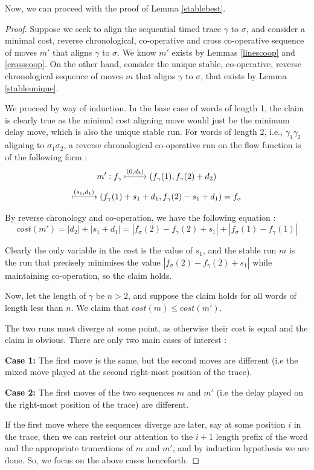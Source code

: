 \documentclass[runningheads]{llncs}
\newcounter{cases}
\begin{document}
Now, we can proceed with the proof of Lemma \ref{stablebest}. 
\begin{proof}

Suppose we seek to align the sequential timed trace $\gamma$ to $\sigma$, and consider a minimal cost, reverse chronological, co-operative and cross co-operative sequence of moves $m'$ that aligns $\gamma$ to $\sigma$. 
We know $m'$ exists by Lemmas \ref{linescoop} and \ref{crosscoop}. 
On the other hand, consider the unique stable, co-operative, reverse chronological sequence of moves $m$ that aligns $\gamma$ to $\sigma$, that exists by Lemma \ref{stableunique}. 

We proceed by way of induction. 
In the base case of words of length 1, the claim is clearly true as the minimal cost aligning move would just be the minimum delay move, which is also the unique stable run. 
For words of length 2, i.e., $\gamma_1\gamma_2$ aligning to $\sigma_1\sigma_2$, a reverse chronological co-operative run on the flow function is of the following form : $$m' : f_\gamma \xmapsto{(0,d_2)} (f_\gamma(1), f_\gamma(2) + d_2)$$$$ \xmapsto{(s_1,d_1)} (f_\gamma(1) + s_1 + d_1, f_\gamma(2) - s_1 + d_1) = f_\sigma$$

By reverse chronology and co-operation, we have the following equation : 
$$cost(m') = |d_2| + |s_1 + d_1| = |f_\sigma(2) - f_\gamma(2) + s_1| + |f_\sigma(1) - f_\gamma(1)|$$

Clearly the only variable in the cost is the value of $s_1$, and the stable run $m$ is the run that precisely minimises the value $|f_\sigma(2) - f_\gamma(2) + s_1|$ while maintaining co-operation, so the claim holds. 

Now, let the length of $\gamma$ be $n > 2$, and suppose the claim holds for all words of length less than $n$. 
We claim that $cost(m) \leq cost(m')$. 

The two runs must diverge at some point, as otherwise their cost is equal and the claim is obvious. There are only two main cases of interest : 

\textbf{Case 1: } The first move is the same, but the second moves are different (i.e the mixed move played at the second right-most position of the trace). 

\textbf{Case 2: }The first moves of the two sequences $m$ and $m'$ (i.e the delay played on the right-most position of the trace) are different. 



If the first move where the sequences diverge are later, say at some position $i$ in the trace, then we can restrict our attention to the $i+1$ length prefix of the word and the appropriate truncations of $m$ and $m'$, and by induction hypothesis we are done. 
So, we focus on the above cases henceforth. 



\end{proof}
\end{document}
